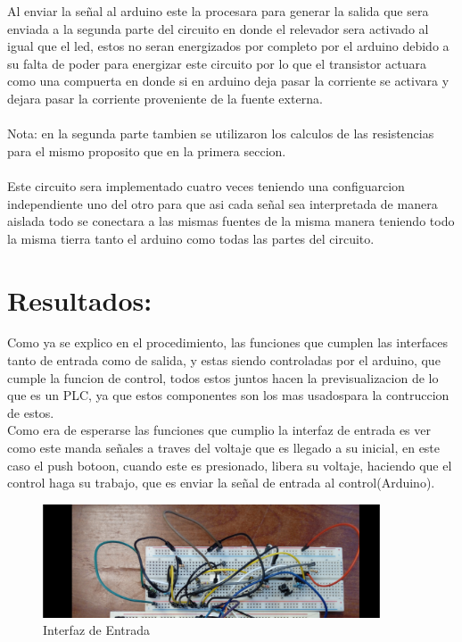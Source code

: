\documentclass[12pt,a4paper]{article}
\begin{document}
Al enviar la señal al arduino este la procesara para generar la salida que sera enviada a la segunda parte del circuito en donde el relevador sera activado al igual que el led, estos no seran energizados por completo por el arduino debido a su falta de poder para energizar este circuito por lo que el transistor actuara como una compuerta en donde si en arduino deja pasar la corriente se activara y dejara pasar la corriente proveniente de la fuente externa.\\\\
Nota: en la segunda parte tambien se utilizaron los calculos de las resistencias para el mismo proposito que en la primera seccion.\\\\
Este circuito sera implementado cuatro veces teniendo una configuarcion independiente uno del otro para que asi cada señal sea interpretada  de manera aislada todo se conectara a las mismas fuentes de la misma manera teniendo todo la misma tierra tanto el arduino como todas las partes del circuito.  

\section{Resultados:}
Como ya se explico en el procedimiento, las funciones que cumplen las interfaces tanto de entrada como de salida, y estas siendo controladas por el arduino, que cumple la funcion de control, todos estos juntos hacen la previsualizacion de lo que es un PLC, ya que estos componentes son los mas usadospara la contruccion de estos.\\
Como era de esperarse las funciones que cumplio la interfaz de entrada es ver como este manda señales a traves del voltaje que es llegado a su inicial, en este caso el push botoon, cuando este es presionado, libera su voltaje, haciendo que el control haga su trabajo, que es enviar la señal de entrada al control(Arduino).\\

\begin{figure}[hbtp]
\centering
\includegraphics[width=10cm]{Opto.png}
\caption{Interfaz de Entrada}
\end{figure}
\end{document}
